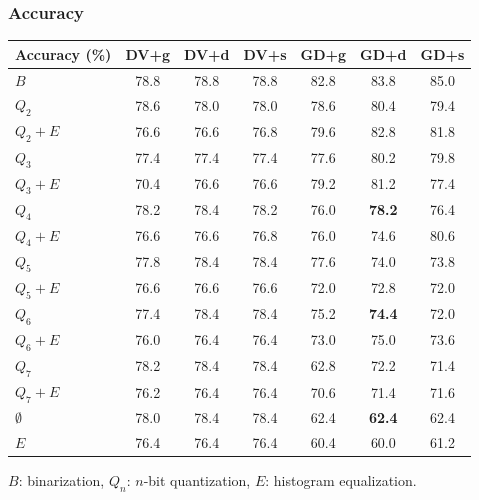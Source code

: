\documentclass{beamer}
\begin{document}
\begin{frame}
  \frametitle{Accuracy}
  \footnotesize
  \begin{table}[h]
    \centering
    \begin{tabular}{l|c|c|c|c|c|c}
      \hline
      \multicolumn{1}{c}{\bfseries Accuracy (\%)} & \multicolumn{1}{c}{\bfseries DV+g} &
      \multicolumn{1}{c}{\bfseries DV+d} & \multicolumn{1}{c}{\bfseries DV+s} &
      \multicolumn{1}{c}{\bfseries GD+g} & \multicolumn{1}{c}{\bfseries GD+d} &
      \multicolumn{1}{c}{\bfseries GD+s}\\
      \hline
      $B$         & 78.8 & 78.8 & 78.8 & 82.8 & 83.8 & 85.0\\
      $Q_2$       & 78.6 & 78.0 & 78.0 & 78.6 & 80.4 & 79.4\\
      $Q_2+E$     & 76.6 & 76.6 & 76.8 & 79.6 & 82.8 & 81.8\\
      $Q_3$       & 77.4 & 77.4 & 77.4 & 77.6 & 80.2 & 79.8\\
      $Q_3+E$     & 70.4 & 76.6 & 76.6 & 79.2 & 81.2 & 77.4\\
      $Q_4$       & 78.2 & 78.4 & 78.2 & 76.0 & \textbf{78.2} & 76.4\\
      $Q_4+E$     & 76.6 & 76.6 & 76.8 & 76.0 & 74.6 & 80.6\\
      $Q_5$       & 77.8 & 78.4 & 78.4 & 77.6 & 74.0 & 73.8\\
      $Q_5+E$     & 76.6 & 76.6 & 76.6 & 72.0 & 72.8 & 72.0\\
      $Q_6$       & 77.4 & 78.4 & 78.4 & 75.2 & \textbf{74.4} & 72.0\\
      $Q_6+E$     & 76.0 & 76.4 & 76.4 & 73.0 & 75.0 & 73.6\\
      $Q_7$       & 78.2 & 78.4 & 78.4 & 62.8 & 72.2 & 71.4\\
      $Q_7+E$     & 76.2 & 76.4 & 76.4 & 70.6 & 71.4 & 71.6\\
      $\emptyset$ & 78.0 & 78.4 & 78.4 & 62.4 & \textbf{62.4} & 62.4\\
      $E$         & 76.4 & 76.4 & 76.4 & 60.4 & 60.0 & 61.2\\
    \end{tabular}
  \end{table}

  \begin{center}
    $B$: binarization, $Q_n$: $n$-bit quantization, $E$: histogram equalization.
  \end{center}
\end{frame}
\end{document}
